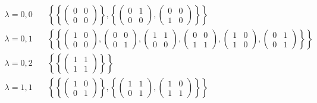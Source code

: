 \documentclass[a4paper]{article}
\begin{document}
\begin{enumerate}
\begin{align*}
\lambda = 0,0 \quad &\left\lbrace
\left\lbrace\begin{pmatrix}0&0\\0&0\end{pmatrix}\right\rbrace,
\left\lbrace\begin{pmatrix}0&1\\0&0\end{pmatrix},
\begin{pmatrix}0&0\\1&0\end{pmatrix} \right\rbrace\right\rbrace\\
\lambda = 0,1 \quad &\left\lbrace \left\lbrace
\begin{pmatrix}1&0\\0&0\end{pmatrix},
\begin{pmatrix}0&0\\0&1\end{pmatrix},
\begin{pmatrix}1&1\\0&0\end{pmatrix},
\begin{pmatrix}0&0\\1&1\end{pmatrix},
\begin{pmatrix}1&0\\1&0\end{pmatrix},
\begin{pmatrix}0&1\\0&1\end{pmatrix}\right\rbrace\right\rbrace \\
\lambda = 0,2 \quad &\left\lbrace \left\lbrace
\begin{pmatrix}1&1\\1&1\end{pmatrix}\right\rbrace\right\rbrace \\
\lambda = 1,1 \quad &\left\lbrace
\left\lbrace \begin{pmatrix}1&0\\0&1\end{pmatrix}\right\rbrace,
\left\lbrace\begin{pmatrix}1&1\\0&1\end{pmatrix},
\begin{pmatrix}1&0\\1&1\end{pmatrix}\right\rbrace\right\rbrace\\

\end{align*}
\end{enumerate}
\end{document}
